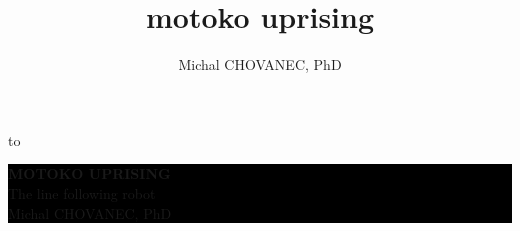 \documentclass[xcolor=dvipsnames]{beamer}
\title{\color{white} \bf motoko uprising}
\author{\color{white} Michal CHOVANEC, PhD}
\date[EURP]{}
\begin{document}
{
    \usebackgroundtemplate
    {
        \vbox to 
    }
    \begin{frame}



    \centering
     \colorbox{black}
     {
        \begin{minipage}{7cm}
           {\LARGE \color{white} {\bf MOTOKO UPRISING} \\ The line following robot} \\
           {\LARGE \color{white} Michal CHOVANEC, PhD} \\
       \end{minipage}
     }


    \end{frame}
}
\end{document}

